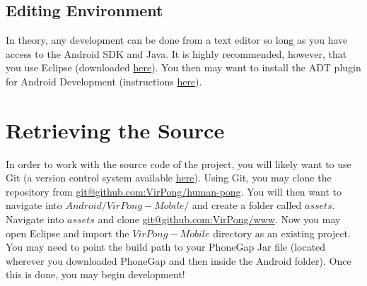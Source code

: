 \documentclass[12pt]{article}
\begin{document}
\subsection{Editing Environment}
In theory, any development can be done from a text editor so long as you have access to the Android SDK and Java.  It is highly recommended, however, that you use Eclipse (downloaded \href{http://www.eclipse.org/downloads/packages/release/helios/sr2}{here}).  You then may want to install the ADT plugin for Android Development (instructions \href{http://developer.android.com/sdk/eclipse-adt.html#installing}{here}).

\section{Retrieving the Source}
In order to work with the source code of the project, you will likely want to use Git (a version control system available \href{https://github.com}{here}).  Using Git, you may clone the repository from \url{git@github.com:VirPong/human-pong}.  You will then want to navigate into $Android/VirPong-Mobile/$ and create a folder called $assets$.  Navigate into $assets$ and clone \url{git@github.com:VirPong/www}.  Now you may open Eclipse and import the $VirPong-Mobile$ directory as an existing project.  You may need to point the build path to your PhoneGap Jar file (located wherever you downloaded PhoneGap and then inside the Android folder).  Once this is done, you may begin development!
\end{document}
